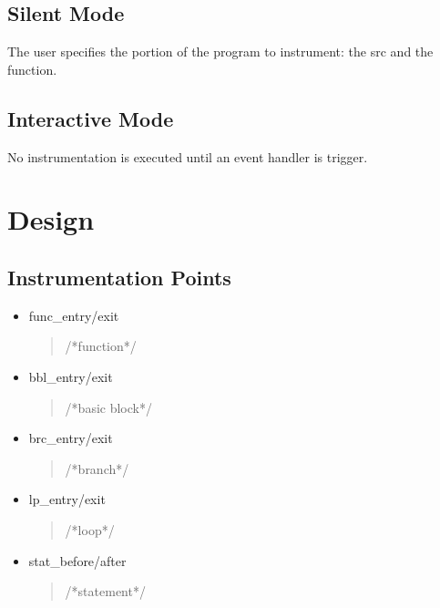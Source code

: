\documentclass[a4paper,twocolumn,10pt]{article}
\def\denseitems{
  \itemsep1pt plus1pt minus1pt
  \parsep0pt plus0pt
  \parskip0pt\topsep0pt}
\begin{document}
\subsection{Silent Mode}
The user specifies the portion of the program to instrument: the src and the function.

\subsection{Interactive Mode}
No instrumentation is executed until an event handler is trigger.

\section{Design}
\subsection{Instrumentation Points}
  \begin{itemize}\denseitems
    \item func\_entry/exit
    \begin{quote}
    /*function*/
    \end{quote}

    \item bbl\_entry/exit
    \begin{quote}
    /*basic block*/
    \end{quote}

    \item brc\_entry/exit
    \begin{quote}
    /*branch*/
    \end{quote}

    \item lp\_entry/exit
    \begin{quote}
    /*loop*/
    \end{quote}

    \item stat\_before/after
    \begin{quote}
    /*statement*/
    \end{quote}

  \end{itemize}
\end{document}
